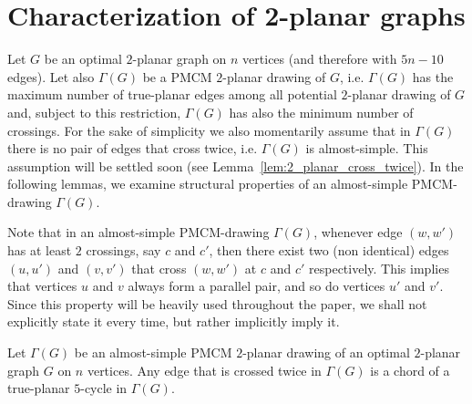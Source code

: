 \section{Characterization of 2-planar graphs}
\label{sec:2planar}

Let $G$ be an optimal $2$-planar graph on $n$ vertices (and therefore with $5n-10$ edges). Let also $\Gamma(G)$ be a PMCM $2$-planar drawing of $G$, i.e. $\Gamma(G)$ has the maximum number of true-planar edges among all potential $2$-planar drawing of $G$ and, subject to this restriction, $\Gamma(G)$ has also the minimum number of crossings. For the sake of simplicity we also momentarily assume that in $\Gamma(G)$ there is no pair of edges that cross twice, i.e. $\Gamma(G)$ is almost-simple. This assumption  will be settled soon (see Lemma~\ref{lem:2_planar_cross_twice}). In the following lemmas, we examine structural properties of an almost-simple PMCM-drawing $\Gamma(G)$.

Note that in an almost-simple PMCM-drawing $\Gamma(G)$, whenever edge $(w,w')$ has at least $2$ crossings, say $c$ and $c'$, then there exist two (non identical) edges $(u,u')$ and $(v,v')$ that cross $(w,w')$ at $c$ and $c'$ respectively. This implies that vertices $u$ and $v$ always form a parallel pair, and so do vertices $u'$ and $v'$. Since this property will be heavily used throughout the paper, we shall not explicitly state it every time, but rather implicitly imply it.


\begin{lemma}
Let $\Gamma(G)$ be an almost-simple PMCM $2$-planar drawing of an optimal $2$-planar graph $G$ on $n$ vertices. Any edge that is crossed twice in  $\Gamma(G)$ is a chord of a true-planar $5$-cycle in $\Gamma(G)$. 
\label{lem:2_planar_small_faces}
\end{lemma}

